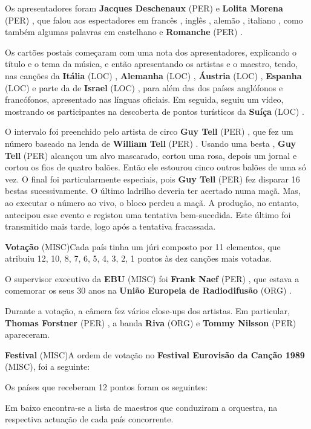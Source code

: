 \documentclass[12pt,a4paper]{article}
\begin{document}
Os apresentadores foram \textbf{Jacques Deschenaux} (PER) e \textbf{Lolita Morena} (PER) , que falou aos espectadores em francês , inglês , alemão , italiano , como também algumas palavras em castelhano e \textbf{Romanche} (PER) .

Os cartões postais começaram com uma nota dos apresentadores, explicando o título e o tema da música, e então apresentando os artistas e o maestro, tendo, nas canções da \textbf{Itália} (LOC) , \textbf{Alemanha} (LOC) , \textbf{Áustria} (LOC) , \textbf{Espanha} (LOC) e parte da de \textbf{Israel} (LOC) , para além das dos países anglófonos e francófonos, apresentado nas línguas oficiais. Em seguida, seguiu um vídeo, mostrando os participantes na descoberta de pontos turísticos da \textbf{Suíça} (LOC) .

O intervalo foi preenchido pelo artista de circo \textbf{Guy Tell} (PER) , que fez um número baseado na lenda de \textbf{William Tell} (PER) . Usando uma besta , \textbf{Guy Tell} (PER) alcançou um alvo mascarado, cortou uma rosa, depois um jornal e cortou os fios de quatro balões. Então ele estourou cinco outros balões de uma só vez. O final foi particularmente especiais, pois \textbf{Guy Tell} (PER) fez disparar 16 bestas sucessivamente. O último ladrilho deveria ter acertado numa maçã. Mas, ao executar o número ao vivo, o bloco perdeu a maçã. A produção, no entanto, antecipou esse evento e registou uma tentativa bem-sucedida. Este último foi transmitido mais tarde, logo após a tentativa fracassada.



\textbf{Votação} (MISC)Cada país tinha um júri composto por 11 elementos, que atribuiu 12, 10, 8, 7, 6, 5, 4, 3, 2, 1 pontos às dez canções mais votadas.

O supervisor executivo da \textbf{EBU} (MISC) foi \textbf{Frank Naef} (PER) , que estava a comemorar os seus 30 anos na \textbf{União Europeia de Radiodifusão} (ORG) .

Durante a votação, a câmera fez vários close-ups dos artistas. Em particular, \textbf{Thomas Forstner} (PER) , a banda \textbf{Riva} (ORG) e \textbf{Tommy Nilsson} (PER) apareceram.



\textbf{Festival} (MISC)A ordem de votação no \textbf{Festival Eurovisão da Canção 1989} (MISC), foi a seguinte:

Os países que receberam 12 pontos foram os seguintes:

Em baixo encontra-se a lista de maestros que conduziram a orquestra, na respectiva actuação de cada país concorrente.
\end{document}
